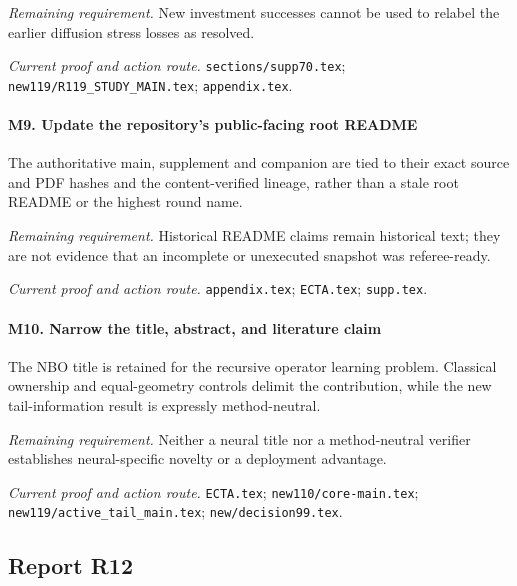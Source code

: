 \par\emph{Remaining requirement.} New investment successes cannot be used to relabel the earlier diffusion stress losses as resolved.

\par\emph{Current proof and action route.} \nolinkurl{sections/supp70.tex}; \nolinkurl{new119/R119_STUDY_MAIN.tex}; \nolinkurl{appendix.tex}.

\paragraph{M9. Update the repository’s public-facing root README}

The authoritative main, supplement and companion are tied to their exact source and PDF hashes and the content-verified lineage, rather than a stale root README or the highest round name.

\par\emph{Remaining requirement.} Historical README claims remain historical text; they are not evidence that an incomplete or unexecuted snapshot was referee-ready.

\par\emph{Current proof and action route.} \nolinkurl{appendix.tex}; \nolinkurl{ECTA.tex}; \nolinkurl{supp.tex}.

\paragraph{M10. Narrow the title, abstract, and literature claim}

The NBO title is retained for the recursive operator learning problem. Classical ownership and equal-geometry controls delimit the contribution, while the new tail-information result is expressly method-neutral.

\par\emph{Remaining requirement.} Neither a neural title nor a method-neutral verifier establishes neural-specific novelty or a deployment advantage.

\par\emph{Current proof and action route.} \nolinkurl{ECTA.tex}; \nolinkurl{new110/core-main.tex}; \nolinkurl{new119/active_tail_main.tex}; \nolinkurl{new/decision99.tex}.

\subsection{Report R12}

